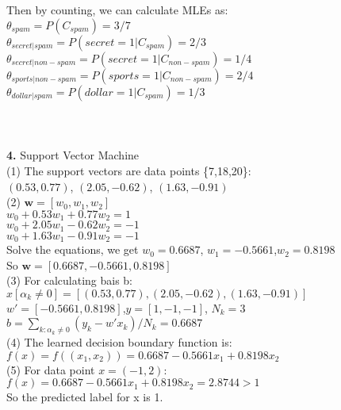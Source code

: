 \documentclass[11pt,a4paper,fleqn]{article}
\begin{document}
Then by counting, we can calculate MLEs as:\\
$\theta_{spam} = P(C_{spam}) = 3/7$\\
$\theta_{secret|spam}  = P(secret=1|C_{spam}) = 2/3$\\
$\theta_{secret|non-spam} = P(secret=1|C_{non-spam}) = 1/4$\\
$\theta_{sports|non-spam} = P(sports=1|C_{non-spam}) = 2/4$\\
$\theta_{dollar|spam} = P(dollar=1|C_{spam}) = 1/3$\\
\\ \\ \\
\textbf{4.} Support Vector Machine\\
(1) The support vectors are data points \{7,18,20\}: \\
\indent $(0.53,0.77)$, $(2.05,-0.62)$, $(1.63,-0.91)$\\
(2) $\mathbf{w} = [w_0,w_1,w_2]$\\
$w_0+0.53w_1+0.77w_2=1$\\
$w_0+2.05w_1-0.62w_2=-1$\\
$w_0+1.63w_1-0.91w_2=-1$\\
Solve the equations, we get $w_0=0.6687$, $w_1=-0.5661$,$w_2=0.8198$\\
So $\mathbf{w}=[0.6687,-0.5661,0.8198]$\\
(3) For calculating bais b:\\
$x[\alpha_k\ne0]=[(0.53,0.77), (2.05,-0.62), (1.63,-0.91)]$\\
$w' = [-0.5661, 0.8198]$,$y = [1,-1,-1]$, $N_k=3$\\
$b=\sum_{k:\alpha_k\ne0}(y_k-w'x_k)/N_k=0.6687$\\
(4) The learned decision boundary function is:\\
$f(x)=f((x_1,x_2))=0.6687-0.5661x_1+0.8198x_2$\\
(5) For data point $x = (-1,2)$:\\
$f(x)=0.6687-0.5661x_1+0.8198x_2=2.8744>1$\\
So  the predicted label for x is 1.\\
\end{document}
